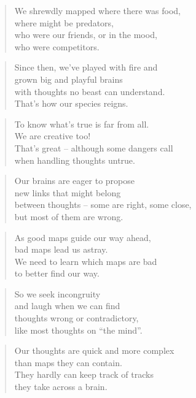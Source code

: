 \documentclass[10pt,a4paper]{article}
\begin{document}
\begin{paracol}{2}
\begin{verse}
We shrewdly mapped where there was food,\\
where might be predators,\\
who were our friends, or in the mood,\\
who were competitors.
\end{verse}

\begin{verse}
Since then, we’ve played with fire and\\
grown big and playful brains\\
with thoughts no beast can understand.\\
That’s how our species reigns.
\end{verse}

\begin{verse}
To know what’s true is far from all.\\
We are creative too!\\
That’s great – although some dangers call\\
when handling thoughts untrue.
\end{verse}

\begin{verse}
Our brains are eager to propose\\
new links that might belong\\
between thoughts – some are right, some close,\\
but most of them are wrong.
\end{verse}

\begin{verse}
As good maps guide our way ahead,\\
bad maps lead us astray.\\
We need to learn which maps are bad\\
to better find our way.
\end{verse}

\begin{verse}
So we seek incongruity\\
and laugh when we can find\\
thoughts wrong or contradictory,\\
like most thoughts on “the mind”.
\end{verse}

\begin{verse}
Our thoughts are quick and more complex\\
than maps they can contain.\\
They hardly can keep track of tracks\\
they take across a brain.
\end{verse}


\end{paracol}
\end{document}
